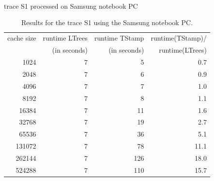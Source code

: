\documentclass[a4paper,12pt, titlepage]{article}  %
\begin{document}
\begin{table}[p]
\begin{center}
	trace S1 processed on Samsung notebook PC
	\begin{tabular}{|r||r|r|r|}
	  	\hline
                cache size                               &     runtime LTrees         &      runtime TStamp          &  runtime(TStamp)/ \\
                                                             &      (in seconds)            &      (in seconds)                 & runtime(LTrees)     \\
                \hline
                1024			             &            7                  &              5                      &        0.7                \\
		2048					     &              7                &        6                            &     0.9                   \\								
		4096					     &              7                &        7                            &     1.0                   \\	
		8192					     &              7                &        8                            &     1.1                   \\	
		16384				     &              7                &        11                            &    1.6                    \\	
		32768				     &              7                &        19                            &    2.7                    \\	
		65536				     &              7                &        36                            &    5.1                    \\	
		131072				     &              7                &        78                            &    11.1                    \\	
		262144				     &              7                &       126                             &   18.0                     \\	
		524288				     &              7                &       110                             &    15.7                    \\
                \hline
	\end{tabular}
	\caption{Results for the trace S1 using the Samsung notebook PC.}
        \label{tab:samsung_S1}
\end{center}
\end{table}
\end{document}
